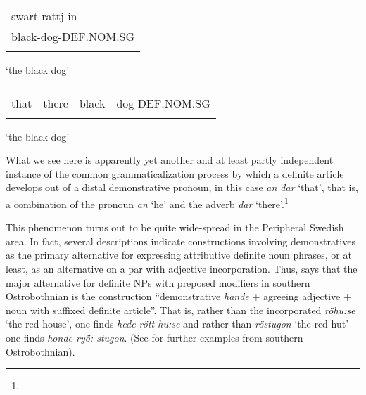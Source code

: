 \begin{tabular}{l}
\lsptoprule
swart-rattj-in\\
black-dog-DEF.NOM.SG\\
\lspbottomrule
\end{tabular}

\begin{styleTranslation}
‘the black dog’

\end{styleTranslation}

\begin{tabular}{llll}
\lsptoprule
\multicolumn{4}{l}{an

}\\
that & there & black & dog-DEF.NOM.SG\\
\lspbottomrule
\end{tabular}

\begin{styleTranslation}
‘the black dog’

\end{styleTranslation}

\begin{styleBodyTextFirst}
What we see here is apparently yet another and at least partly independent instance of the common grammaticalization process by which a definite article develops out of a distal demonstrative pronoun, in this case \textit{an dar} ‘that’, that is, a combination of the pronoun \textit{an} ‘he’ and the adverb \textit{dar} ‘there’.\footnote{} 

\end{styleBodyTextFirst}

\begin{styleBodytextC}
This phenomenon turns out to be quite wide-spread in the Peripheral Swedish area. In fact, several descriptions indicate constructions involving demonstratives as the primary alternative for expressing attributive definite noun phrases, or at least, as an alternative on a par with adjective incorporation. Thus, \citet{Ivars2005} says that the major alternative for definite NPs with preposed modifiers in southern Ostrobothnian is the construction “demonstrative \textit{hande} + agreeing adjective + noun with suffixed definite article”. That is, rather than the incorporated \textit{röhu:se} ‘the red house’, one finds \textit{hede rött hu:se} and rather than \textit{röstugon} ‘the red hut’ one finds \textit{honde ryö: stugon}. (See \citet[158]{Vangsnes2003} for further examples from southern Ostrobothnian). 

\end{styleBodytextC}

